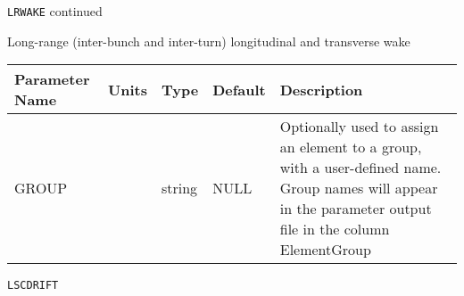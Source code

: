 \newpage
\begin{center}{\Large\verb|LRWAKE| continued}\end{center}
Long-range (inter-bunch and inter-turn) longitudinal and transverse wake
\\
\begin{tabular}{|l|l|l|l|p{\descwidth}|} \hline
Parameter Name & Units & Type & Default & Description \\ \hline 
GROUP &  & string & NULL & Optionally used to assign an element to a group, with a user-defined name.  Group names will appear in the parameter output file in the column ElementGroup  \\ \hline 
\end{tabular}

\vspace*{0.5in}

\newpage
\begin{center}{\Large\verb|LSCDRIFT|}\end{center}
